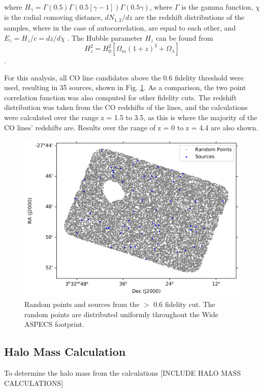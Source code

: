 where $H_{\gamma} = \Gamma(0.5)\Gamma(0.5[\gamma -1])\Gamma(0.5\gamma)$, where $\Gamma$ is the gamma function, $\chi$ is the radial comoving distance, $dN_{1,2}/dz$ are the redshift distributions of the samples, where in the case of autocorrelation, are equal to each other, and $E_z = H_z/c = dz/d\chi$ \cite{hickox2011clustering}. The Hubble parameter $H_z$ can be found from
$$H_z^2 = H_0^2[\Omega_m(1+z)^3 + \Omega_{\lambda}]$$ \cite{hickox2011clustering}.

For this analysis, all CO line candidates above the 0.6 fidelity threshold were used, resulting in 35 sources, shown in Fig. \ref{fig:Clustering_points}. As a comparison, the two point correlation function was also computed for other fidelity cuts. The redshift distribution was taken from the CO redshifts of the lines, and the calculations were calculated over the range z = 1.5 to 3.5, as this is where the majority of the CO lines' redshifts are. Results over the range of z = 0 to z = 4.4 are also shown. 

\begin{figure}[tbp]
\centering \includegraphics[width=120mm]{PDFS/NX_V_Y_Sources_20000.png}
\caption{Random points and sources from the $>$ 0.6 fidelity cut. The random points are distributed uniformly throughout the Wide ASPECS footprint.}
\label{fig:Clustering_points}
\end{figure}

\subsection{Halo Mass Calculation}

To determine the halo mass from the calculations [INCLUDE HALO MASS CALCULATIONS]

